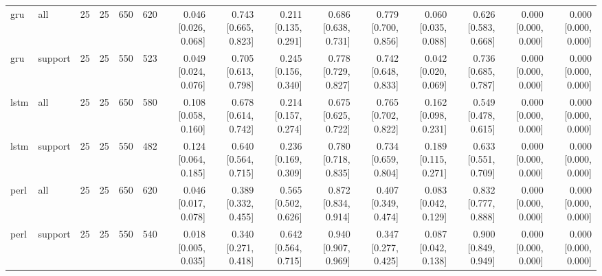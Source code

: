 \begin{table}[htbp]
{\begin{tabular}{llrrrrrrrrrrrrr}
gru & all & 25 & 25 & 650 & 620 & 0.046 [0.026, 0.068] & 0.743 [0.665, 0.823] & 0.211 [0.135, 0.291] & 0.686 [0.638, 0.731] & 0.779 [0.700, 0.856] & 0.060 [0.035, 0.088] & 0.626 [0.583, 0.668] & 0.000 [0.000, 0.000] & 0.000 [0.000, 0.000] \\
gru & support & 25 & 25 & 550 & 523 & 0.049 [0.024, 0.076] & 0.705 [0.613, 0.798] & 0.245 [0.156, 0.340] & 0.778 [0.729, 0.827] & 0.742 [0.648, 0.833] & 0.042 [0.020, 0.069] & 0.736 [0.685, 0.787] & 0.000 [0.000, 0.000] & 0.000 [0.000, 0.000] \\
lstm & all & 25 & 25 & 650 & 580 & 0.108 [0.058, 0.160] & 0.678 [0.614, 0.742] & 0.214 [0.157, 0.274] & 0.675 [0.625, 0.722] & 0.765 [0.702, 0.822] & 0.162 [0.098, 0.231] & 0.549 [0.478, 0.615] & 0.000 [0.000, 0.000] & 0.000 [0.000, 0.000] \\
lstm & support & 25 & 25 & 550 & 482 & 0.124 [0.064, 0.185] & 0.640 [0.564, 0.715] & 0.236 [0.169, 0.309] & 0.780 [0.718, 0.835] & 0.734 [0.659, 0.804] & 0.189 [0.115, 0.271] & 0.633 [0.551, 0.709] & 0.000 [0.000, 0.000] & 0.000 [0.000, 0.000] \\
perl & all & 25 & 25 & 650 & 620 & 0.046 [0.017, 0.078] & 0.389 [0.332, 0.455] & 0.565 [0.502, 0.626] & 0.872 [0.834, 0.914] & 0.407 [0.349, 0.474] & 0.083 [0.042, 0.129] & 0.832 [0.777, 0.888] & 0.000 [0.000, 0.000] & 0.000 [0.000, 0.000] \\
perl & support & 25 & 25 & 550 & 540 & 0.018 [0.005, 0.035] & 0.340 [0.271, 0.418] & 0.642 [0.564, 0.715] & 0.940 [0.907, 0.969] & 0.347 [0.277, 0.425] & 0.087 [0.042, 0.138] & 0.900 [0.849, 0.949] & 0.000 [0.000, 0.000] & 0.000 [0.000, 0.000] \\
\bottomrule
\end{tabular}
}
\end{table}
